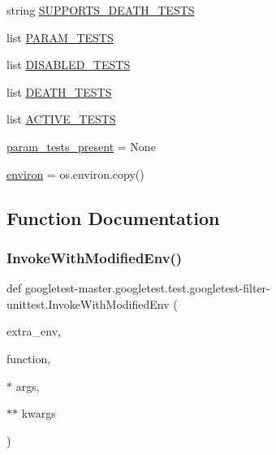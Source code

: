 \begin{DoxyCompactItemize}
\item 
string \mbox{\hyperlink{namespacegoogletest-master_1_1googletest_1_1test_1_1googletest-filter-unittest_a38f2f2e1d3958035cd559c5dba78ffad}{S\+U\+P\+P\+O\+R\+T\+S\+\_\+\+D\+E\+A\+T\+H\+\_\+\+T\+E\+S\+TS}}
\item 
list \mbox{\hyperlink{namespacegoogletest-master_1_1googletest_1_1test_1_1googletest-filter-unittest_a1e3164ba7871d214cbfe3bfddf5815da}{P\+A\+R\+A\+M\+\_\+\+T\+E\+S\+TS}}
\item 
list \mbox{\hyperlink{namespacegoogletest-master_1_1googletest_1_1test_1_1googletest-filter-unittest_aa77df40d5f0ad8d817412633fe4923ed}{D\+I\+S\+A\+B\+L\+E\+D\+\_\+\+T\+E\+S\+TS}}
\item 
list \mbox{\hyperlink{namespacegoogletest-master_1_1googletest_1_1test_1_1googletest-filter-unittest_a16efc2ca10f7224cf90ae15c06b540ef}{D\+E\+A\+T\+H\+\_\+\+T\+E\+S\+TS}}
\item 
list \mbox{\hyperlink{namespacegoogletest-master_1_1googletest_1_1test_1_1googletest-filter-unittest_af9e7b6d973a455400b01e578f546a0b9}{A\+C\+T\+I\+V\+E\+\_\+\+T\+E\+S\+TS}}
\item 
\mbox{\hyperlink{namespacegoogletest-master_1_1googletest_1_1test_1_1googletest-filter-unittest_af37d07e585b1b93ff6aef6ee6c39e682}{param\+\_\+tests\+\_\+present}} = None
\item 
\mbox{\hyperlink{namespacegoogletest-master_1_1googletest_1_1test_1_1googletest-filter-unittest_a1c47d007a4a6d573965940a6fbb8fe54}{environ}} = os.\+environ.\+copy()
\end{DoxyCompactItemize}


\subsection{Function Documentation}
\mbox{\label{namespacegoogletest-master_1_1googletest_1_1test_1_1googletest-filter-unittest_a7e4dd2054503003db0d6b42edc1c6815}} 
\subsubsection{\texorpdfstring{InvokeWithModifiedEnv()}{InvokeWithModifiedEnv()}}
{\footnotesize\ttfamily def googletest-\/master.\+googletest.\+test.\+googletest-\/filter-\/unittest.\+Invoke\+With\+Modified\+Env (\begin{DoxyParamCaption}\item[{}]{extra\+\_\+env,  }\item[{}]{function,  }\item[{$\ast$}]{args,  }\item[{$\ast$$\ast$}]{kwargs }\end{DoxyParamCaption})}

